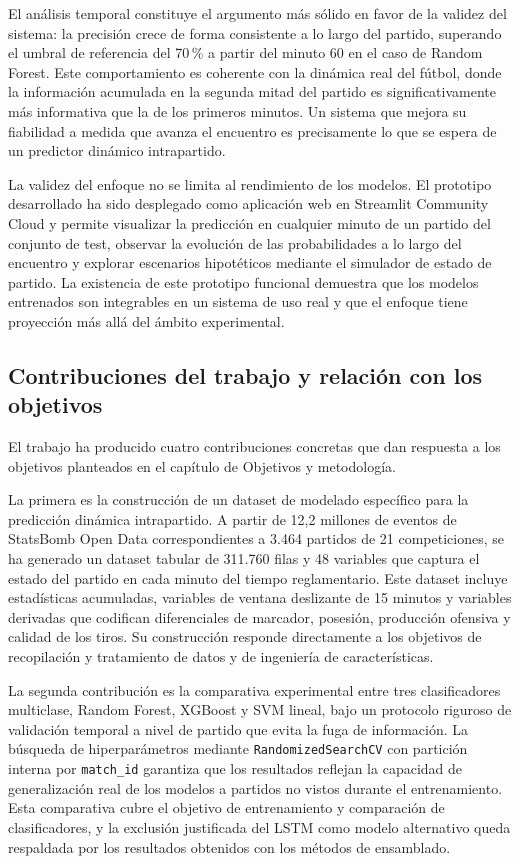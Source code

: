 El análisis temporal constituye el argumento más sólido en favor de la validez del sistema: la precisión crece de forma consistente a lo largo del partido, superando el umbral de referencia del 70\,\% a partir del minuto 60 en el caso de Random Forest. Este comportamiento es coherente con la dinámica real del fútbol, donde la información acumulada en la segunda mitad del partido es significativamente más informativa que la de los primeros minutos. Un sistema que mejora su fiabilidad a medida que avanza el encuentro es precisamente lo que se espera de un predictor dinámico intrapartido.

La validez del enfoque no se limita al rendimiento de los modelos. El prototipo desarrollado ha sido desplegado como aplicación web en Streamlit Community Cloud y permite visualizar la predicción en cualquier minuto de un partido del conjunto de test, observar la evolución de las probabilidades a lo largo del encuentro y explorar escenarios hipotéticos mediante el simulador de estado de partido. La existencia de este prototipo funcional demuestra que los modelos entrenados son integrables en un sistema de uso real y que el enfoque tiene proyección más allá del ámbito experimental.

\subsection{Contribuciones del trabajo y relación con los objetivos}

El trabajo ha producido cuatro contribuciones concretas que dan respuesta a los objetivos planteados en el capítulo de Objetivos y metodología.

La primera es la construcción de un dataset de modelado específico para la predicción dinámica intrapartido. A partir de 12,2 millones de eventos de StatsBomb Open Data correspondientes a 3.464 partidos de 21 competiciones, se ha generado un dataset tabular de 311.760 filas y 48 variables que captura el estado del partido en cada minuto del tiempo reglamentario. Este dataset incluye estadísticas acumuladas, variables de ventana deslizante de 15 minutos y variables derivadas que codifican diferenciales de marcador, posesión, producción ofensiva y calidad de los tiros. Su construcción responde directamente a los objetivos de recopilación y tratamiento de datos y de ingeniería de características.

La segunda contribución es la comparativa experimental entre tres clasificadores multiclase, Random Forest, XGBoost y SVM lineal, bajo un protocolo riguroso de validación temporal a nivel de partido que evita la fuga de información. La búsqueda de hiperparámetros mediante \texttt{RandomizedSearchCV} con partición interna por \texttt{match\_id} garantiza que los resultados reflejan la capacidad de generalización real de los modelos a partidos no vistos durante el entrenamiento. Esta comparativa cubre el objetivo de entrenamiento y comparación de clasificadores, y la exclusión justificada del LSTM como modelo alternativo queda respaldada por los resultados obtenidos con los métodos de ensamblado.

